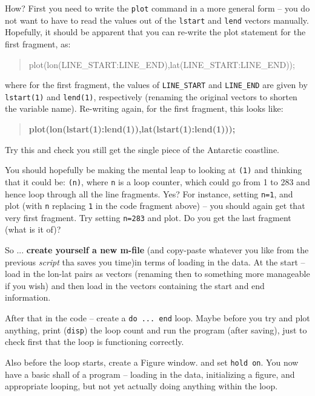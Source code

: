 \documentclass{tufte-book} %
\newenvironment{docspec}{\begin{quotation}\ttfamily\parskip0pt\parindent0pt\ignorespaces}{\end{quotation}}
\newenvironment{docspecbold}{\begin{quotation}\ttfamily\bfseries\parskip0pt\parindent0pt\ignorespaces}{\end{quotation}}
\begin{document}
How? First you need to write the \texttt{plot} command in a more general form -- you do not want to have to read the values out of the \texttt{lstart} and \texttt{lend} vectors manually. Hopefully, it should be apparent that you can re-write the plot statement for the first fragment, as:
\begin{docspec}
plot(lon(LINE\_START:LINE\_END),lat(LINE\_START:LINE\_END));
\end{docspec}
where for the first fragment, the values of \texttt{LINE\_START} and \texttt{LINE\_END} are given by \texttt{lstart(1)} and \texttt{lend(1)}, respectively (renaming the original vectors to shorten the variable name). Re-writing again, for the first fragment, this looks like:
\begin{docspecbold}
plot(lon(lstart(1):lend(1)),lat(lstart(1):lend(1)));
\end{docspecbold}

Try this and check you still get the single piece of the Antarctic coastline.

You should hopefully be making the mental leap to looking at \texttt{(1)} and thinking that it could be: \texttt{(n)}, where \texttt{n} is a loop counter, which could go from 1 to 283 and hence loop through all the line fragments. Yes? For instance, setting \texttt{n=1}, and plot (with \texttt{n} replacing \texttt{1} in the code fragment above) -- you should again get that very  first fragment. Try setting \texttt{n=283} and plot. Do you get the last fragment (what is it of)?

So ...\textbf{ create yourself a new m-file} (and copy-paste whatever you like from the previous \textit{script} tha saves you time)in terms of loading in the data. At the start -- load in the lon-lat pairs as vectors (renaming then to something more manageable if you wish) and then load in the vectors containing the start and end information. 

After that in the code -- create a \texttt{do ... end} loop. Maybe before you try and plot anything, print (\texttt{disp}) the loop count and run the program (after saving), just to check first that the loop is functioning correctly. 

Also before the loop starts, create a \textsf{Figure window}. and set \texttt{hold on}. You now have a basic shall of a program -- loading in the data, initializing a figure, and appropriate looping, but not yet actually doing anything within the loop.
\end{document}

